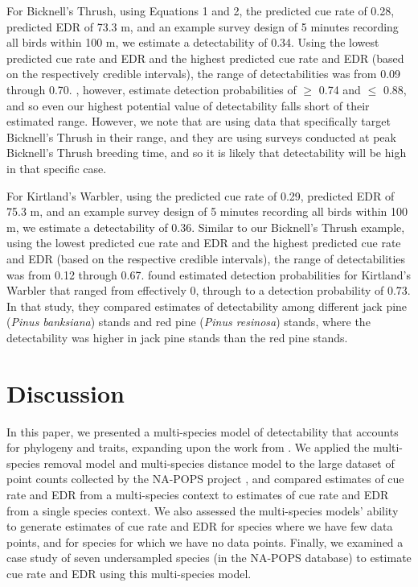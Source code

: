 \par For Bicknell's Thrush, using Equations 1 and 2, the predicted cue rate of 0.28, predicted EDR of 73.3 m, and an example survey design of 5 minutes recording all birds within 100 m, we estimate a detectability of 0.34.
Using the lowest predicted cue rate and EDR and the highest predicted cue rate and EDR (based on the respectively credible intervals), the range of detectabilities was from 0.09 through 0.70.
\citet{aubry_bicknells_2018}, however, estimate detection probabilities of $\geq$ 0.74 and $\leq$ 0.88, and so even our highest potential value of detectability falls short of their estimated range.
However, we note that \citet{aubry_bicknells_2018} are using data that specifically target Bicknell's Thrush in their range, and they are using surveys conducted at peak Bicknell's Thrush breeding time, and so it is likely that detectability will be high in that specific case.

\par For Kirtland’s Warbler, using the predicted cue rate of 0.29, predicted EDR of 75.3 m, and an example survey design of 5 minutes recording all birds within 100 m, we estimate a detectability of 0.36.
Similar to our Bicknell’s Thrush example, using the lowest predicted cue rate and EDR and the highest predicted cue rate and EDR (based on the respective credible intervals), the range of detectabilities was from 0.12 through 0.67.
\citet{van_dyke_comparative_2022} found estimated detection probabilities for Kirtland’s Warbler that ranged from effectively 0, through to a detection probability of 0.73.
In that study, they compared estimates of detectability among different jack pine (\textit{Pinus banksiana}) stands and red pine (\textit{Pinus resinosa}) stands, where the detectability was higher in jack pine stands than the red pine stands.

\section{Discussion}

\par In this paper, we presented a multi-species model of detectability that accounts for phylogeny and traits, expanding upon the work from \citet{solymos_phylogeny_2018}.
We applied the multi-species removal model and multi-species distance model to the large dataset of point counts collected by the NA-POPS project \citep{edwards_point_2023}, and compared estimates of cue rate and EDR from a multi-species context to estimates of cue rate and EDR from a single species context.
We also assessed the multi-species models' ability to generate estimates of cue rate and EDR for species where we have few data points, and for species for which we have no data points.
Finally, we examined a case study of seven undersampled species (in the NA-POPS database) to estimate cue rate and EDR using this multi-species model.

